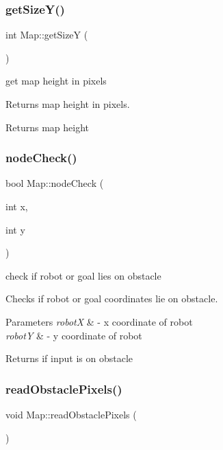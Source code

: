 \subsubsection{\texorpdfstring{get\+Size\+Y()}{getSizeY()}}
{\footnotesize\ttfamily int Map\+::get\+SizeY (\begin{DoxyParamCaption}{ }\end{DoxyParamCaption})}



get map height in pixels 

Returns map height in pixels.

\begin{DoxyReturn}{Returns}
map height 
\end{DoxyReturn}
\mbox{\label{classMap_a4f6c50a5e192f6bf465c4dd6cb4a8806}} 
\subsubsection{\texorpdfstring{node\+Check()}{nodeCheck()}}
{\footnotesize\ttfamily bool Map\+::node\+Check (\begin{DoxyParamCaption}\item[{int}]{x,  }\item[{int}]{y }\end{DoxyParamCaption})}



check if robot or goal lies on obstacle 

Checks if robot or goal coordinates lie on obstacle.


\begin{DoxyParams}{Parameters}
{\em robotX} & -\/ x coordinate of robot \\
\hline
{\em robotY} & -\/ y coordinate of robot \\
\hline
\end{DoxyParams}
\begin{DoxyReturn}{Returns}
if input is on obstacle 
\end{DoxyReturn}
\mbox{\label{classMap_a9d1151b9e6dade109c4448db724e02aa}} 
\subsubsection{\texorpdfstring{read\+Obstacle\+Pixels()}{readObstaclePixels()}}
{\footnotesize\ttfamily void Map\+::read\+Obstacle\+Pixels (\begin{DoxyParamCaption}{ }\end{DoxyParamCaption})}



